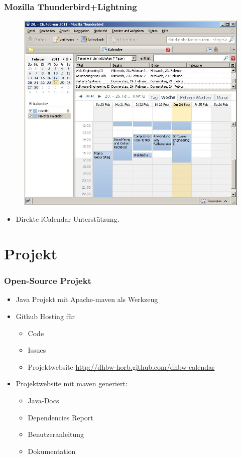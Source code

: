 \documentclass{beamer}
\begin{document}
\begin{frame}\frametitle{Mozilla Thunderbird+Lightning}
  \begin{figure}
    \centering
    \includegraphics[height=0.6\paperheight]{images/dhbwcalendar-lightning.jpg}
  \end{figure}
  \begin{itemize}
    \item Direkte iCalendar Unterstützung.
  \end{itemize}
\end{frame}


\section{Projekt}

\begin{frame}\frametitle{Open-Source Projekt}
  \begin{itemize}
  \item Java Projekt mit Apache-maven als Werkzeug
  \item Github Hosting für
    \begin{itemize}
    \item Code
    \item Issues
    \item Projektwebsite \url{http://dhbw-horb.github.com/dhbw-calendar}
    \end{itemize}
  \item Projektwebsite mit maven generiert:
    \begin{itemize}
      \item Java-Docs
      \item Dependencies Report
      \item Benutzeranleitung
      \item Dokumentation
    \end{itemize}
  \end{itemize}
\end{frame}
\end{document}

